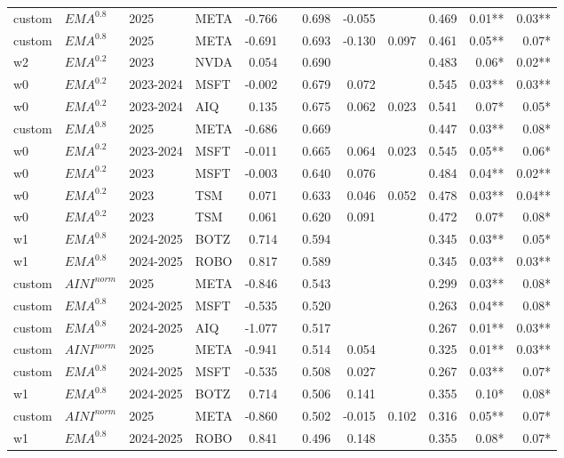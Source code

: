 {\begin{tabularx}{\textwidth}{@{}X@{\hspace{0.5pt}}X@{\hspace{0.5pt}}X@{\hspace{0.5pt}}X@{\hspace{2.0pt}} r r r r r r r r@{}}
custom & $EMA^{0.8}$ & 2025 & META & -0.766 &  & 0.698 & -0.055 &  & 0.469 & 0.01** & 0.03** \\
custom & $EMA^{0.8}$ & 2025 & META & -0.691 &  & 0.693 & -0.130 & 0.097 & 0.461 & 0.05** & 0.07* \\
w2 & $EMA^{0.2}$ & 2023 & NVDA & 0.054 &  & 0.690 &  &  & 0.483 & 0.06* & 0.02** \\
w0 & $EMA^{0.2}$ & 2023-2024 & MSFT & -0.002 &  & 0.679 & 0.072 &  & 0.545 & 0.03** & 0.03** \\
w0 & $EMA^{0.2}$ & 2023-2024 & AIQ & 0.135 &  & 0.675 & 0.062 & 0.023 & 0.541 & 0.07* & 0.05* \\
custom & $EMA^{0.8}$ & 2025 & META & -0.686 &  & 0.669 &  &  & 0.447 & 0.03** & 0.08* \\
w0 & $EMA^{0.2}$ & 2023-2024 & MSFT & -0.011 &  & 0.665 & 0.064 & 0.023 & 0.545 & 0.05** & 0.06* \\
w0 & $EMA^{0.2}$ & 2023 & MSFT & -0.003 &  & 0.640 & 0.076 &  & 0.484 & 0.04** & 0.02** \\
w0 & $EMA^{0.2}$ & 2023 & TSM & 0.071 &  & 0.633 & 0.046 & 0.052 & 0.478 & 0.03** & 0.04** \\
w0 & $EMA^{0.2}$ & 2023 & TSM & 0.061 &  & 0.620 & 0.091 &  & 0.472 & 0.07* & 0.08* \\
w1 & $EMA^{0.8}$ & 2024-2025 & BOTZ & 0.714 &  & 0.594 &  &  & 0.345 & 0.03** & 0.05* \\
w1 & $EMA^{0.8}$ & 2024-2025 & ROBO & 0.817 &  & 0.589 &  &  & 0.345 & 0.03** & 0.03** \\
custom & $AINI^{norm}$ & 2025 & META & -0.846 &  & 0.543 &  &  & 0.299 & 0.03** & 0.08* \\
custom & $EMA^{0.8}$ & 2024-2025 & MSFT & -0.535 &  & 0.520 &  &  & 0.263 & 0.04** & 0.08* \\
custom & $EMA^{0.8}$ & 2024-2025 & AIQ & -1.077 &  & 0.517 &  &  & 0.267 & 0.01** & 0.03** \\
custom & $AINI^{norm}$ & 2025 & META & -0.941 &  & 0.514 & 0.054 &  & 0.325 & 0.01** & 0.03** \\
custom & $EMA^{0.8}$ & 2024-2025 & MSFT & -0.535 &  & 0.508 & 0.027 &  & 0.267 & 0.03** & 0.07* \\
w1 & $EMA^{0.8}$ & 2024-2025 & BOTZ & 0.714 &  & 0.506 & 0.141 &  & 0.355 & 0.10* & 0.08* \\
custom & $AINI^{norm}$ & 2025 & META & -0.860 &  & 0.502 & -0.015 & 0.102 & 0.316 & 0.05** & 0.07* \\
w1 & $EMA^{0.8}$ & 2024-2025 & ROBO & 0.841 &  & 0.496 & 0.148 &  & 0.355 & 0.08* & 0.07* \\

\end{tabularx}}
